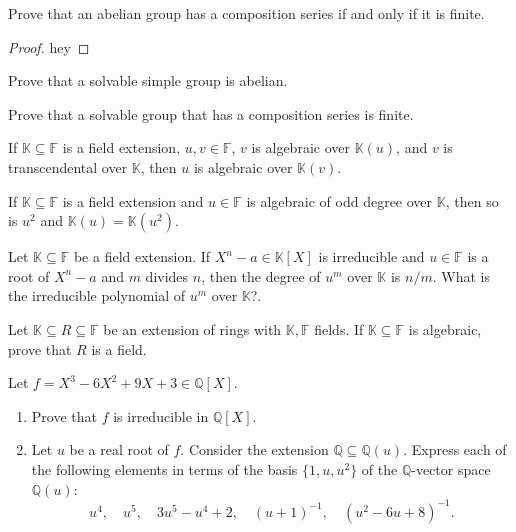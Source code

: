 \documentclass[addpoints,10pt]{exam}
\theoremstyle{plain}
\theoremstyle{definition}
\newtheorem{prob}[thm]{Problem}
\theoremstyle{plain}
\theoremstyle{plain}
\theoremstyle{definition}
\let\oldprob\prob
\let\endoldprob\endprob
\renewenvironment{prob}
  {\begin{singlespace}\oldprob}
  {\endoldprob\end{singlespace}}
\newcommand{\FF}{\ensuremath{\mathbb{F}}}
\newcommand{\KK}{\ensuremath{\mathbb{K}}}
\begin{document}
\setcounter{thm}{39}   %
\begin{prob}
Prove that an abelian group has a composition series if and only if it is finite.
\end{prob}

\begin{proof}
hey
\end{proof}
\newpage
\begin{prob}
Prove that a solvable simple group is abelian.
\end{prob}
\newpage
\begin{prob}
Prove that a solvable group that has a composition series is finite.
\end{prob}
\newpage
\setcounter{thm}{44}   %
\begin{prob}
If $\KK\subseteq \FF$ is a field extension, $u,v\in \FF$, $v$ is algebraic over $\KK(u)$, and $v$ is transcendental over $\KK$, then $u$ is algebraic over $\KK(v)$.
\end{prob}
\newpage
\begin{prob}
If $\KK\subseteq \FF$ is a field extension and $u\in \FF$ is algebraic of odd degree over $\KK$, then so is $u^{2}$ and $\KK(u)=\KK(u^{2})$. 
\end{prob}
\newpage
\begin{prob}
Let $\KK \subseteq \FF$ be a field extension. If $X^n - a \in \KK[X]$ is irreducible and $u \in \FF$ is a root of $X^n - a$ and $m$ divides $n$, then the degree of $u^m$ over $\KK$ is $n/m$. What is the irreducible polynomial of $u^m$ over $\KK$?.
\end{prob}
\newpage
\begin{prob}
Let $\KK \subseteq R \subseteq \FF$ be an extension of rings with $\KK,\FF$ fields. If $\KK \subseteq \FF$ is algebraic, prove that $R$ is a field.
\end{prob}
\newpage
\begin{prob}
Let $f = X^3 - 6X^2 + 9X + 3 \in \mathbb{Q}[X]$.
\begin{enumerate}[label=(\alph*)]
\item Prove that $f$ is irreducible in $\mathbb{Q}[X]$.
\item Let $u$ be a real root of $f$. Consider the extension $\mathbb{Q} \subseteq \mathbb{Q}(u)$. Express each of the following elements in terms of the basis $\{1,u,u^2\}$ of the $\mathbb{Q}$-vector space $\mathbb{Q}(u)$:
\[
u^4,\quad u^5,\quad 3u^5 - u^4 + 2,\quad (u+1)^{-1},\quad (u^2 - 6u + 8)^{-1}.
\]
\end{enumerate}
\end{prob}
\end{document}
